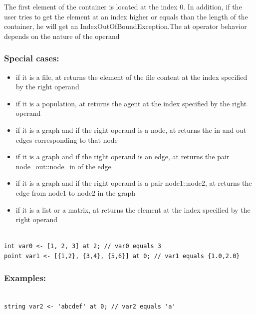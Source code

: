 \documentclass[]{book}
\providecommand{\tightlist}{%
  \setlength{\itemsep}{0pt}\setlength{\parskip}{0pt}}
\theoremstyle{definition}
\theoremstyle{definition}
\theoremstyle{definition}
\theoremstyle{remark}
\begin{document}
The first element of the container is located at the index 0. In
addition, if the user tries to get the element at an index higher or
equals than the length of the container, he will get an
IndexOutOfBoundException.The at operator behavior depends on the nature
of the operand

\subsubsection{Special cases:}\label{special-cases-23}

\begin{itemize}
\tightlist
\item
  if it is a file, at returns the element of the file content at the
  index specified by the right operand\\
\item
  if it is a population, at returns the agent at the index specified by
  the right operand\\
\item
  if it is a graph and if the right operand is a node, at returns the in
  and out edges corresponding to that node\\
\item
  if it is a graph and if the right operand is an edge, at returns the
  pair node\_out::node\_in of the edge\\
\item
  if it is a graph and if the right operand is a pair node1::node2, at
  returns the edge from node1 to node2 in the graph\\
\item
  if it is a list or a matrix, at returns the element at the index
  specified by the right operand
\end{itemize}

\begin{verbatim}
 
int var0 <- [1, 2, 3] at 2; // var0 equals 3 
point var1 <- [{1,2}, {3,4}, {5,6}] at 0; // var1 equals {1.0,2.0}
\end{verbatim}

\subsubsection{Examples:}\label{examples-46}

\begin{verbatim}
 
string var2 <- 'abcdef' at 0; // var2 equals 'a'
\end{verbatim}
\end{document}
